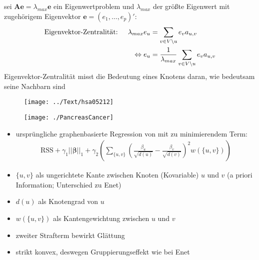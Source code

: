 \documentclass{beamer}
\begin{document}
\begin{frame}
sei $\mathbf{A}\mathbf{e}=\lambda_{max} \mathbf{e}$ ein Eigenwertproblem und $\lambda_{max}$ der größte Eigenwert mit zugehörigem Eigenvektor $\mathbf{e}=(e_1,\dots, e_{p})'$:
	\begin{align*}
	&\text{Eigenvektor-Zentralität: } & \lambda_{max} e_u &= \sum_{v \in V\setminus u} e_v a_{u,v} \notag \\
	&&\Leftrightarrow e_u &=\frac{1}{\lambda_{max}} \sum_{v \in V\setminus u} e_v a_{u,v}
	\end{align*}
	Eigenvektor-Zentralität misst die Bedeutung eines Knotens daran, wie bedeutsam seine Nachbarn sind 
\end{frame}


\begin{frame}
\begin{figure}
\centering
\texttt{[image: ../Text/hsa05212]}
\label{fig:hsa05212}
\end{figure}
\end{frame}


\begin{frame}
\begin{figure}
\centering
\texttt{[image: ./PancreasCancer]}
\label{fig:pancreas}
\end{figure}
\end{frame}



\begin{frame}
	\begin{itemize}
	\item ursprüngliche graphenbasierte Regression von \cite{li_network-constrained_2008} mit zu minimierendem Term:
	\begin{align*}
	\text{RSS}
	+\gamma_1||\boldsymbol{\beta}||_1
	+\gamma_2 \left( \sum_{\{u,v\}} \left(\frac{\beta_u}{\sqrt{d(u)}}-\frac{\beta_v}{\sqrt{d(v)}}\right)^2 w(\{u,v\})\right)
	\end{align*}
	\item $\{u,v\}$ als ungerichtete Kante zwischen Knoten (Kovariable) $u$ und $v$ (a priori Information; Unterschied zu Enet)
	\item $d(u)$ als Knotengrad von $u$
	\item $w(\{u,v\})$ als Kantengewichtung zwischen $u$ und $v$
	\item zweiter Strafterm bewirkt Glättung
	\item strikt konvex, deswegen Gruppierungseffekt wie bei Enet
	\end{itemize}
\end{frame}
\end{document}
